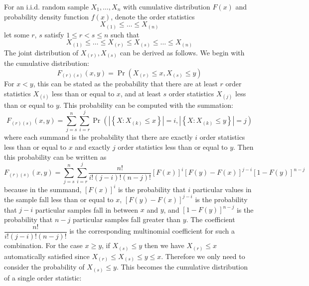 \documentclass[11pt]{report} %
\begin{document}
For an i.i.d. random sample $X_{1}, \dots, X_{n}$ with cumulative distribution $F\left(x\right)$ and probability density function $f\left(x\right)$, denote the order statistics
\begin{equation}
X_{\left(1\right)} \leq \dots \leq X_{\left(n\right)}
\end{equation}
let some $r$, $s$ satisfy $1 \leq r < s \leq n$ such that
\begin{equation}
X_{\left(1\right)} \leq \dots \leq X_{\left(r\right)} \leq X_{\left(s\right)} \leq \dots \leq X_{\left(n\right)}
\end{equation}
The joint distribution of $X_{\left(r\right)}, X_{\left(s\right)}$ can be derived as follows. We begin with the cumulative distribution:
\begin{equation}
F_{\left(r\right)\left(s\right)}\left(x, y\right) = \operatorname{Pr}\left(X_{\left(r\right)} \leq x, X_{\left(s\right)} \leq y\right)
\end{equation}
For $x < y$, this can be stated as the probability that there are at least $r$ order statistics $X_{\left(i\right)}$ less than or equal to $x$, and at least $s$ order statistics $X_{\left(j\right)}$ less than or equal to $y$. This probability can be computed with the summation:
\begin{equation}
F_{\left(r\right)\left(s\right)}\left(x, y\right) = \sum_{j = s}^{n}\sum_{i = r}^{j}\operatorname{Pr}\left(\left|\left\{X: X_{\left(k\right)} \leq x\right\}\right| = i, \left|\left\{X: X_{\left(k\right)} \leq y\right\}\right| = j\right)
\end{equation}
where each summand is the probability that there are exactly $i$ order statistics less than or equal to $x$ and exactly $j$ order statistics less than or equal to $y$. Then this probability can be written as
\begin{equation}
F_{\left(r\right)\left(s\right)}\left(x, y\right) = \sum_{j = s}^{n}\sum_{i = r}^{j}\dfrac{n!}{i!\left(j - i\right)!\left(n - j\right)!}\left[F\left(x\right)\right]^{i}\left[F\left(y\right) - F\left(x\right)\right]^{j - i}\left[1 - F\left(y\right)\right]^{n - j}
\end{equation}
because in the summand, $\left[F\left(x\right)\right]^{i}$ is the probability that $i$ particular values in the sample fall less than or equal to $x$, $\left[F\left(y\right) - F\left(x\right)\right]^{j - i}$ is the probability that $j - i$ particular samples fall in between $x$ and $y$, and $\left[1 - F\left(y\right)\right]^{n - j}$ is the probability that $n - j$ particular samples fall greater than $y$. The coefficient $\dfrac{n!}{i!\left(j - i\right)!\left(n - j\right)!}$ is the corresponding multinomial coefficient for such a combination. For the case $x \geq y$, if $X_{\left(s\right)} \leq y$ then we have $X_{\left(r\right)} \leq x$ automatically satisfied since $X_{\left(r\right)} \leq X_{\left(s\right)} \leq y \leq x$. Therefore we only need to consider the probability of $X_{\left(s\right)} \leq y$. This becomes the cumulative distribution of a single order statistic:
\end{document}
